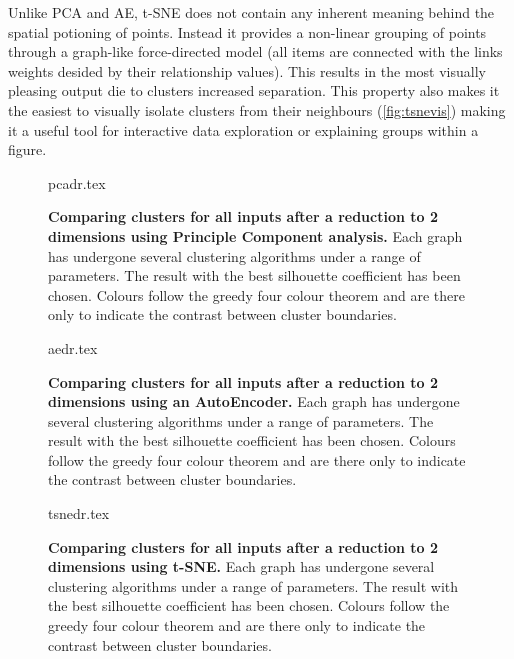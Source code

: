 Unlike PCA and AE, t-SNE does not contain any inherent meaning behind the spatial potioning of points. Instead it provides a non-linear grouping of points through a graph-like force-directed model (all items are connected with the links weights desided by their relationship values). This results in the most visually pleasing output die to clusters increased separation. This property also  makes it the easiest to visually isolate clusters from their neighbours (\autoref{fig:tsnevis}) making it a useful tool for interactive data exploration or explaining groups within a figure.


\begin{landscape}
\begin{figure}[H]
    {pcadr.tex}
    \caption{\textbf{Comparing clusters for all inputs after a reduction to 2 dimensions using Principle Component analysis.}
    Each graph has undergone several clustering algorithms under a range of parameters. The result with the best silhouette coefficient has been chosen. Colours follow the greedy four colour theorem and are there only to indicate the contrast between cluster boundaries.}
    \label{fig:pcavis}
\end{figure}
\end{landscape}


\begin{landscape}
\begin{figure}[H]
    {aedr.tex}
    \caption{\textbf{Comparing clusters for all inputs after a reduction to 2 dimensions using an AutoEncoder.}
    Each graph has undergone several clustering algorithms under a range of parameters. The result with the best silhouette coefficient has been chosen. Colours follow the greedy four colour theorem and are there only to indicate the contrast between cluster boundaries.}
    \label{fig:aevis}
\end{figure}
\end{landscape}


\begin{landscape}
\begin{figure}[H]
    {tsnedr.tex}
    \caption{\textbf{Comparing clusters for all inputs after a reduction to 2 dimensions using t-SNE.}
    Each graph has undergone several clustering algorithms under a range of parameters. The result with the best silhouette coefficient has been chosen. Colours follow the greedy four colour theorem and are there only to indicate the contrast between cluster boundaries.}
    \label{fig:tsnevis}
\end{figure}
\end{landscape}



